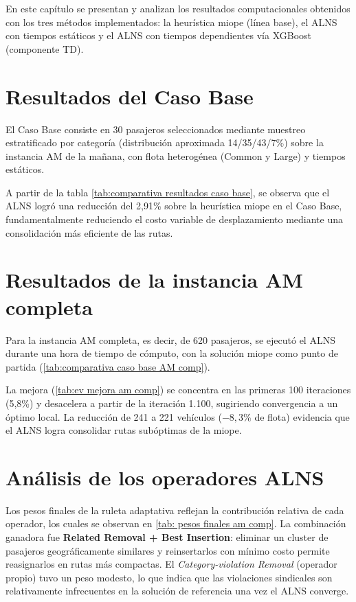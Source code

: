 En este capítulo se presentan y analizan los resultados computacionales obtenidos con los tres métodos implementados: la heurística miope (línea base), el ALNS con tiempos estáticos y el ALNS con tiempos dependientes vía XGBoost (componente TD).

\section{Resultados del Caso Base}

El Caso Base consiste en 30 pasajeros seleccionados mediante muestreo estratificado por categoría (distribución aproximada 14/35/43/7\%) sobre la instancia AM de la mañana, con flota heterogénea (Common y Large) y tiempos estáticos.


A partir de la tabla \ref{tab:comparativa resultados caso base}, se observa que el ALNS logró una reducción del 2,91\% sobre la heurística miope en el Caso Base, fundamentalmente reduciendo el costo variable de desplazamiento mediante una consolidación más eficiente de las rutas.

\section{Resultados de la instancia AM completa}

Para la instancia AM completa, es decir, de 620 pasajeros, se ejecutó el ALNS durante una hora de tiempo de cómputo, con la solución miope como punto de partida (\ref{tab:comparativa caso base AM comp}).



La mejora (\ref{tab:ev mejora am comp}) se concentra en las primeras 100 iteraciones (5,8\%) y desacelera a partir de la iteración 1.100, sugiriendo convergencia a un óptimo local. La reducción de 241 a 221 vehículos ($-8,3\%$ de flota) evidencia que el ALNS logra consolidar rutas subóptimas de la miope.

\section{Análisis de los operadores ALNS}

Los pesos finales de la ruleta adaptativa reflejan la contribución relativa de cada operador, los cuales se observan en \ref{tab: pesos finales am comp}. La combinación ganadora fue \textbf{Related Removal + Best Insertion}: eliminar un cluster de pasajeros geográficamente similares y reinsertarlos con mínimo costo permite reasignarlos en rutas más compactas. El \textit{Category-violation Removal} (operador propio) tuvo un peso modesto, lo que indica que las violaciones sindicales son relativamente infrecuentes en la solución de referencia una vez el ALNS converge.

